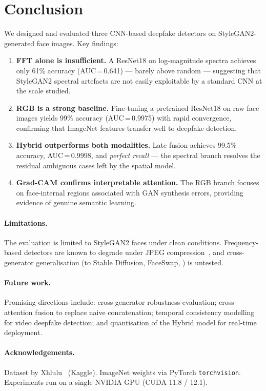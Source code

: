 \section{Conclusion}
\label{sec:conclusion}

We designed and evaluated three CNN-based deepfake detectors on
StyleGAN2-generated face images.
Key findings:

\begin{enumerate}
  \item \textbf{FFT alone is insufficient.}  A ResNet18 on log-magnitude
    spectra achieves only 61\% accuracy (AUC\,=\,0.641) — barely above
    random — suggesting that StyleGAN2 spectral artefacts are not easily
    exploitable by a standard CNN at the scale studied.

  \item \textbf{RGB is a strong baseline.}  Fine-tuning a pretrained
    ResNet18 on raw face images yields 99\% accuracy (AUC\,=\,0.9975) with
    rapid convergence, confirming that ImageNet features transfer well to
    deepfake detection.

  \item \textbf{Hybrid outperforms both modalities.}  Late fusion achieves
    99.5\% accuracy, AUC\,=\,0.9998, and \emph{perfect recall} — the
    spectral branch resolves the residual ambiguous cases left by the
    spatial model.

  \item \textbf{Grad-CAM confirms interpretable attention.}  The RGB branch
    focuses on face-internal regions associated with GAN synthesis errors,
    providing evidence of genuine semantic learning.
\end{enumerate}

\paragraph{Limitations.}
The evaluation is limited to StyleGAN2 faces under clean conditions.
Frequency-based detectors are known to degrade under JPEG
compression~\cite{frank2020frequency}, and cross-generator
generalisation (to Stable Diffusion, FaceSwap, \etc) is untested.

\paragraph{Future work.}
Promising directions include: cross-generator robustness evaluation;
cross-attention fusion to replace naive concatenation; temporal consistency
modelling for video deepfake detection; and quantisation of the Hybrid model
for real-time deployment.

\paragraph{Acknowledgements.}
Dataset by Xhlulu~\cite{dataset140k} (Kaggle).
ImageNet weights via PyTorch \texttt{torchvision}.
Experiments run on a single NVIDIA GPU (CUDA 11.8 / 12.1).
